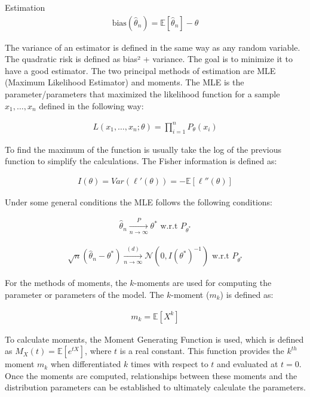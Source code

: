 \documentclass{beamer}
\begin{document}
\begin{frame}
\begin{columns}
\begin{column}{0.3\textwidth}
\begin{block}{Estimation}
\begin{align*}
    \text{bias}(\hat{\theta}_n) = \mathbb{E}[\hat{\theta}_n] - \theta
\end{align*}

The variance of an estimator is defined in the same way as any random variable. The quadratic risk is defined as bias² + variance. The goal is to minimize it to have a good estimator. The two principal methods of estimation are MLE (Maximum Likelihood Estimator) and moments. The MLE is the parameter/parameters that maximized the likelihood function for a sample $x_1, \ldots, x_n$ defined in the following way:

\begin{align*}
    L(x_1, \ldots, x_n; \theta) = \prod_{i=1}^n P_\theta(x_i)
\end{align*}

To find the maximum of the function is usually take the log of the previous function to simplify the calculations. The Fisher information is defined as:

\begin{align*}
    I(\theta) = Var(\ell'(\theta)) = -\mathbb{E}[\ell''(\theta)]
\end{align*}

Under some general conditions the MLE follows the following conditions:

\begin{align*}
    \hat{\theta}_n \xrightarrow[n \to \infty]{P} \theta^* \text{ w.r.t } P_{\theta^*}
\end{align*}

\begin{align*}
    \sqrt{n}(\hat{\theta}_n - \theta^*) \xrightarrow[n \to \infty]{(d)} \mathcal{N}(0, I(\theta^*)^{-1}) \text{ w.r.t } P_{\theta^*}
\end{align*}

For the methods of moments, the $k$-moments are used for computing the parameter or parameters of the model. The $k$-moment ($m_k$) is defined as: 

\begin{align*}
    m_k = \mathbb{E}[X^k]
\end{align*}

To calculate moments, the Moment Generating Function is used, which is defined as $M_X(t) = \mathbb{E}[e^{tX}]$, where $t$ is a real constant. This function provides the $k^{th}$ moment $m_k$ when differentiated $k$ times with respect to $t$ and evaluated at $t=0$. Once the moments are computed, relationships between these moments and the distribution parameters can be established to ultimately calculate the parameters.


\end{block}
\end{column}
\end{columns}
\end{frame}
\end{document}
